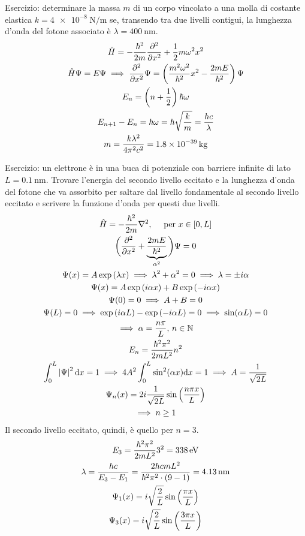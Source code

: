 Esercizio:
determinare la massa $m$ di un corpo vincolato a una molla di costante elastica $k = \qty{4e-8}{\newton\per\metre}$ se, transendo tra due livelli contigui, la lunghezza d'onda del fotone associato è $\lambda = \qty{400}{\nano\metre}$.
\begin{gather}
    \hat{H} = -\frac{\hbar^2}{2 m} \parder[][2]{x} + \frac{1}{2} m \omega^2 x^2 \\
    \hat{H} \Psi = E \Psi \implies
    \parder[][2]{x} \Psi = \pts{\frac{m^2 \omega^2}{\hbar^2} x^2 - \frac{2 m E}{\hbar^2}} \Psi \\
    E_n = \pts{n + \frac{1}{2}} \hbar \omega \\
    E_{n+1} - E_n = \hbar \omega = \hbar \sqrt{\frac{k}{m}} = \frac{h c}{\lambda} \\
    m = \frac{k \lambda^2}{4 \pi^2 c^2} = \qty{1.8e-39}{\kilo\gram}
\end{gather}

Esercizio:
un elettrone è in una buca di potenziale con barriere infinite di lato $L = \qty{0.1}{\nano\metre}$.
Trovare l'energia del secondo livello eccitato e la lunghezza d'onda del fotone che va assorbito per saltare dal livello fondamentale al secondo livello eccitato e scrivere la funzione d'onda per questi due livelli.
\begin{gather}
    \hat{H} = -\frac{\hbar^2}{2 m} \lapl, \quad \text{ per } x \in [0, L] \\
    \bigg(\parder[][2]{x} + \underbrace{\frac{2 m E}{\hbar^2}}_{\alpha^2}\bigg) \Psi = 0 \\
    \Psi(x) = A \exp{\lambda x} \implies \lambda^2 + \alpha^2 = 0 \implies \lambda = \pm \im \alpha \\
    \Psi(x) = A \exp{\im \alpha x} + B \exp{-\im \alpha x} \\
    \Psi(0) = 0 \implies A + B = 0 \\
    \Psi(L) = 0 \implies \exp{\im \alpha L} - \exp{-\im \alpha L} = 0 \implies \sin(\alpha L) = 0 \\
    \implies \alpha = \frac{n \pi}{L}, \, n \in \N \\
    E_n = \frac{\hbar^2 \pi^2}{2 m L^2} n^2 \\
    \int_0^L \abs{\Psi}^2 \de x = 1 \implies 4 A^2 \int_0^L \sin^2(\alpha x) \de x = 1 \implies A = \frac{1}{\sqrt{2 L}} \\
    \Psi_n(x) = 2 \im \frac{1}{\sqrt{2 L}} \sin\pts{\frac{n \pi x}{L}} \\
    \implies n \ge 1
\end{gather}
Il secondo livello eccitato, quindi, è quello per $n = 3$.
\begin{gather}
    E_3 = \frac{\hbar^2 \pi^2}{2 m L^2} 3^2 = \qty{338}{\electronvolt} \\
    \lambda = \frac{h c}{E_3 - E_1} = \frac{2 h c m L^2}{\hbar^2 \pi^2 \cdot (9 - 1)} = \qty{4.13}{\nano\metre} \\
    \Psi_1(x) = i \sqrt{\frac{2}{L}} \sin\left( \frac{\pi x}{L} \right) \\
    \Psi_3(x) = i \sqrt{\frac{2}{L}} \sin\left( \frac{3 \pi x}{L} \right)
\end{gather}

